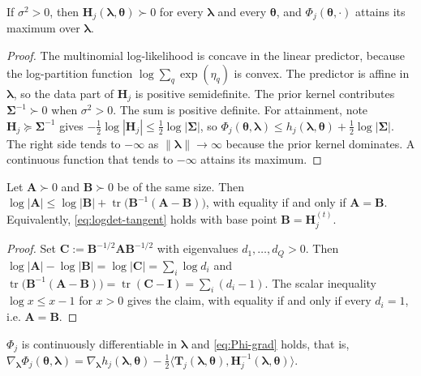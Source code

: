 \begin{lemma}
If $\sigma^{2}>0$, then $\mathbf{H}_{j}(\bm{\lambda},\bm{\theta})\succ0$ for every $\bm{\lambda}$ and every $\bm{\theta}$, and $\Phi_{j}(\bm{\theta},\cdot)$ attains its maximum over $\bm{\lambda}$.
\label{lem:H-pd}
\end{lemma}

\begin{proof}
The multinomial log-likelihood is concave in the linear predictor, because the log-partition function $\log\sum_{q}\exp(\eta_{q})$ is convex. The predictor is affine in $\bm{\lambda}$, so the data part of $\mathbf{H}_{j}$ is positive semidefinite. The prior kernel contributes $\bm{\Sigma}^{-1}\succ0$ when $\sigma^{2}>0$. The sum is positive definite. For attainment, note $\mathbf{H}_{j}\succeq\bm{\Sigma}^{-1}$ gives $-\frac{1}{2}\log|\mathbf{H}_{j}|\leq\frac{1}{2}\log|\bm{\Sigma}|$, so $\Phi_{j}(\bm{\theta},\bm{\lambda})\leq h_{j}(\bm{\lambda},\bm{\theta})+\frac{1}{2}\log|\bm{\Sigma}|$. The right side tends to $-\infty$ as $\|\bm{\lambda}\|\to\infty$ because the prior kernel dominates. A continuous function that tends to $-\infty$ attains its maximum.
\end{proof}

\begin{lemma}
Let $\mathbf{A}\succ0$ and $\mathbf{B}\succ0$ be of the same size. Then $\log|\mathbf{A}|\leq\log|\mathbf{B}|+\operatorname{tr}\big(\mathbf{B}^{-1}(\mathbf{A}-\mathbf{B})\big)$, with equality if and only if $\mathbf{A}=\mathbf{B}$. Equivalently, \eqref{eq:logdet-tangent} holds with base point $\mathbf{B}=\mathbf{H}_{j}^{(t)}$.
\label{lem:logdet-tangent}
\end{lemma}

\begin{proof}
Set $\mathbf{C}:=\mathbf{B}^{-1/2}\mathbf{A}\mathbf{B}^{-1/2}$ with eigenvalues $d_{1},\dots,d_{Q}>0$. Then $\log|\mathbf{A}|-\log|\mathbf{B}|=\log|\mathbf{C}|=\sum_{i}\log d_{i}$ and $\operatorname{tr}\big(\mathbf{B}^{-1}(\mathbf{A}-\mathbf{B})\big)=\operatorname{tr}(\mathbf{C}-\mathbf{I})=\sum_{i}(d_{i}-1)$. The scalar inequality $\log x\leq x-1$ for $x>0$ gives the claim, with equality if and only if every $d_{i}=1$, i.e. $\mathbf{A}=\mathbf{B}$.
\end{proof}

\begin{lemma}
$\Phi_{j}$ is continuously differentiable in $\bm{\lambda}$ and \eqref{eq:Phi-grad} holds, that is, $\nabla_{\bm{\lambda}}\Phi_{j}(\bm{\theta},\bm{\lambda})=\nabla_{\bm{\lambda}}h_{j}(\bm{\lambda},\bm{\theta})-\frac{1}{2}\big\langle\mathbf{T}_{j}(\bm{\lambda},\bm{\theta}),\mathbf{H}_{j}^{-1}(\bm{\lambda},\bm{\theta})\big\rangle$.
\label{lem:Phi-grad}
\end{lemma}

